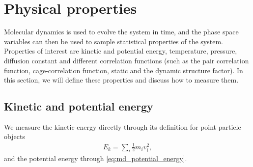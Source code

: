 \section{Physical properties}
Molecular dynamics is used to evolve the system in time, and the phase space variables can then be used to sample statistical properties of the system. Properties of interest are kinetic and potential energy, temperature, pressure, diffusion constant and different correlation functions (such as the pair correlation function, cage-correlation function, static and the dynamic structure factor). In this section, we will define these properties and discuss how to measure them.
\subsection{Kinetic and potential energy}
We measure the kinetic energy directly through its definition for point particle objects
\begin{align}
	E_k = \sum_i \frac{1}{2} m_iv_i^2,
\end{align}
and the potential energy through \eqref{eq:md_potential_energy}. 